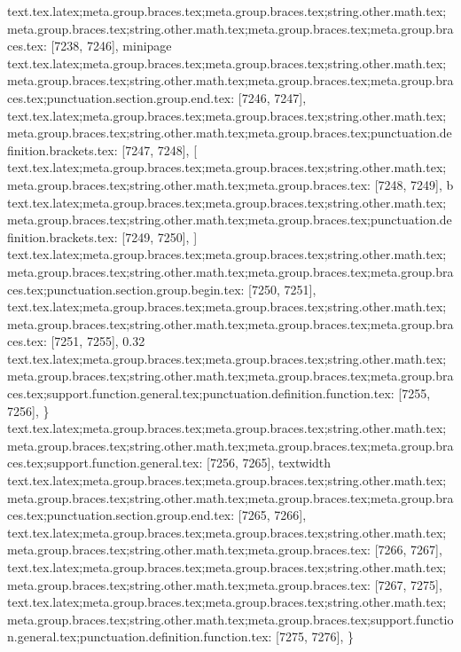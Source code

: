 {{{{{{{{{{{{{{{{{{{{{{{{{{{{{{{{{{{{{{{{{{{{{{{{{{{{{{{{{{{{{{{{{{{{{{{{{{{{{{{{{{{{{{{{{{{{{{{{{{{{{{{{{{{{{{{{{{{{{{{{{{{{{{{{{{{{{{{{{{{{{{{{{{{{{{{{{{{{{{{{{{{{{{{{{{{{{{{{{{{{{{{{{{{{{{{{{text.tex.latex;meta.group.braces.tex;meta.group.braces.tex;string.other.math.tex;meta.group.braces.tex;string.other.math.tex;meta.group.braces.tex;meta.group.braces.tex: [7238, 7246], {minipage}
text.tex.latex;meta.group.braces.tex;meta.group.braces.tex;string.other.math.tex;meta.group.braces.tex;string.other.math.tex;meta.group.braces.tex;meta.group.braces.tex;punctuation.section.group.end.tex: [7246, 7247], {}}
text.tex.latex;meta.group.braces.tex;meta.group.braces.tex;string.other.math.tex;meta.group.braces.tex;string.other.math.tex;meta.group.braces.tex;punctuation.definition.brackets.tex: [7247, 7248], {[}
text.tex.latex;meta.group.braces.tex;meta.group.braces.tex;string.other.math.tex;meta.group.braces.tex;string.other.math.tex;meta.group.braces.tex: [7248, 7249], {b}
text.tex.latex;meta.group.braces.tex;meta.group.braces.tex;string.other.math.tex;meta.group.braces.tex;string.other.math.tex;meta.group.braces.tex;punctuation.definition.brackets.tex: [7249, 7250], {]}
text.tex.latex;meta.group.braces.tex;meta.group.braces.tex;string.other.math.tex;meta.group.braces.tex;string.other.math.tex;meta.group.braces.tex;meta.group.braces.tex;punctuation.section.group.begin.tex: [7250, 7251], {{}
text.tex.latex;meta.group.braces.tex;meta.group.braces.tex;string.other.math.tex;meta.group.braces.tex;string.other.math.tex;meta.group.braces.tex;meta.group.braces.tex: [7251, 7255], {0.32}
text.tex.latex;meta.group.braces.tex;meta.group.braces.tex;string.other.math.tex;meta.group.braces.tex;string.other.math.tex;meta.group.braces.tex;meta.group.braces.tex;support.function.general.tex;punctuation.definition.function.tex: [7255, 7256], {\}
text.tex.latex;meta.group.braces.tex;meta.group.braces.tex;string.other.math.tex;meta.group.braces.tex;string.other.math.tex;meta.group.braces.tex;meta.group.braces.tex;support.function.general.tex: [7256, 7265], {textwidth}
text.tex.latex;meta.group.braces.tex;meta.group.braces.tex;string.other.math.tex;meta.group.braces.tex;string.other.math.tex;meta.group.braces.tex;meta.group.braces.tex;punctuation.section.group.end.tex: [7265, 7266], {}}
text.tex.latex;meta.group.braces.tex;meta.group.braces.tex;string.other.math.tex;meta.group.braces.tex;string.other.math.tex;meta.group.braces.tex: [7266, 7267], {
}
text.tex.latex;meta.group.braces.tex;meta.group.braces.tex;string.other.math.tex;meta.group.braces.tex;string.other.math.tex;meta.group.braces.tex: [7267, 7275], {        }
text.tex.latex;meta.group.braces.tex;meta.group.braces.tex;string.other.math.tex;meta.group.braces.tex;string.other.math.tex;meta.group.braces.tex;support.function.general.tex;punctuation.definition.function.tex: [7275, 7276], {\}
}}}}}}}}}}}}}}}}}}}}}}}}}}}}}}}}}}}}}}}}}}}}}}}}}}}}}}}}}}}}}}}}}}}}}}}}}}}}}}}}}}}}}}}}}}}}}}}}}}}}}}}}}}}}}}}}}}}}}}}}}}}}}}}}}}}}}}}}}}}}}}}}}}}}}}}}}}}}}}}}}}}}}}}}}}}}}}}}}}}}}}}}}}}}}}}}}}

